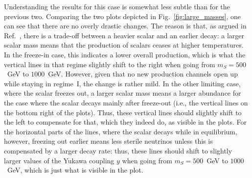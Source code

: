 Understanding the results for this case is somewhat less subtle than for the previous two. Comparing the two plots depicted in Fig.~\ref{fig:large_masses}, one can see that there are no overly drastic changes. The reason is that, as argued in Ref.~\cite{Merle:2015oja}, there is a trade-off between a heavier scalar and an earlier decay: a larger scalar mass means that the production of scalars ceases at higher temperatures. In the freeze-in case, this indicates a lower overall production, which is what the vertical lines in that regime slightly shift to the right when going from $m_S = 500$~GeV to $1000$~GeV. However, given that no new production channels open up while staying in regime~I, the change is rather mild. In the other limiting case, where the scalar freezes out, a larger scalar mass means a larger abundance for the case where the scalar decays mainly after freeze-out (i.e., the vertical lines on the bottom right of the plots). Thus, these vertical lines should slightly shift to the left to compensate for that, which they indeed do, as visible in the plots. For the horizontal parts of the lines, where the scalar decays while in equilibrium, however, freezing out earlier means less sterile neutrinos unless this is compensated by a larger decay rate: thus, these lines should shift to slightly larger values of the Yukawa coupling $y$ when going from $m_S = 500$~GeV to $1000$~GeV, which is just what is visible in the plot.


